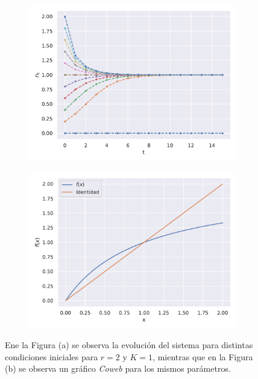 \begin{figure}[hb!]
    \centering
    \begin{subfigure}[b]{0.49\textwidth}
        \includegraphics[width=\textwidth, height=0.8\textwidth]{Mapeo_r=2.pdf}
        \caption{}
        \label{01_Simulacion}
    \end{subfigure}
    \hfill
    \begin{subfigure}[b]{0.49\textwidth}
        \includegraphics[width=\textwidth, height=0.8\textwidth]{Coweb_r=2.pdf}
        \caption{}
        \label{01_Coweb}
    \end{subfigure}
    \caption{Ene  la Figura (a) se observa la evolución del sistema para distintas condiciones iniciales para $r=2$ y $K=1$, mientras que en la Figura (b) se observa un gráfico \textit{Coweb} para los mismos parámetros.}
    \label{ej01_Simulacion}
\end{figure}

